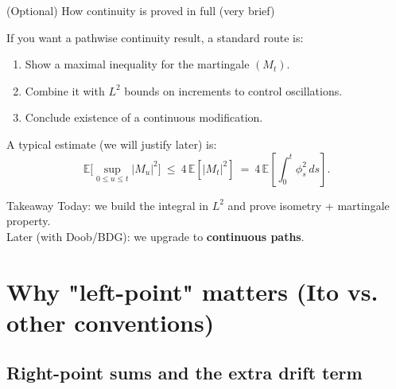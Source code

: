 \documentclass[10pt,aspectratio=169]{beamer}
\newcommand{\E}{\mathbb{E}}
\begin{document}
\begin{frame}{(Optional) How continuity is proved in full (very brief)}

If you want a pathwise continuity result, a standard route is:\pause
\begin{enumerate}
  \item Show a maximal inequality for the martingale $(M_t)$.\pause
  \item Combine it with $L^2$ bounds on increments to control oscillations.\pause
  \item Conclude existence of a continuous modification.\pause
\end{enumerate}

\medskip
A typical estimate (we will justify later) is:\pause
\[
\E\Big[\sup_{0\le u\le t} |M_u|^2\Big]
\ \le\ 4\,\E[|M_t|^2]
\ =\ 4\,\E\!\left[\int_0^t \phi_s^2\,ds\right].
\]
\pause

\begin{alertblock}{Takeaway}
Today: we build the integral in $L^2$ and prove isometry + martingale property.\\
Later (with Doob/BDG): we upgrade to \textbf{continuous paths}.
\end{alertblock}

\end{frame}

\section{Why "left-point" matters (Ito vs. other conventions)}

\subsection{Right-point sums and the extra drift term}
\end{document}

